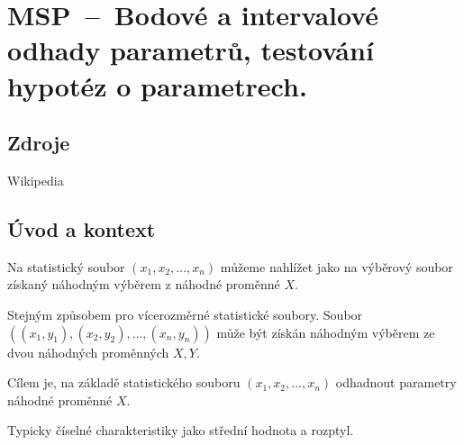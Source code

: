 

\graphicspath{{msp/odhady_parametru/figures}}


\chapter{MSP~--~Bodové a intervalové odhady parametrů, testování hypotéz o parametrech.}


\section{Zdroje}

\begin{compactitem}
    \item {}
    \item Wikipedia
\end{compactitem}


\section{Úvod a kontext}

\begin{compactitem}
    \item Na statistický soubor $(x_1, x_2, \ldots, x_n)$ můžeme nahlížet jako na výběrový soubor získaný náhodným výběrem z náhodné proměnné $X$. \begin{compactitem}
        \item Stejným způsobem pro vícerozměrné statistické soubory. Soubor\break $((x_1, y_1), (x_2, y_2), \ldots, (x_n, y_n))$ může být získán náhodným výběrem ze dvou náhodných proměnných $X, Y$.
    \end{compactitem}

    \item Cílem je, na základě statistického souboru $(x_1, x_2, \ldots, x_n)$ odhadnout parametry náhodné proměnné $X$. \begin{compactitem}

        \item Typicky číselné charakteristiky jako střední hodnota a rozptyl.
    \end{compactitem}
\end{compactitem}

